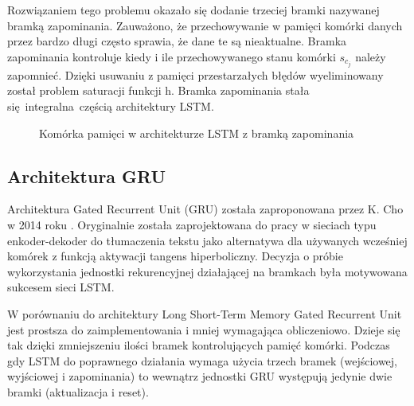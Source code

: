 \documentclass[10pt,a4paper]{article}
\begin{document}
Rozwiązaniem tego problemu okazało się dodanie trzeciej bramki nazywanej bramką zapominania. Zauważono, że przechowywanie w pamięci komórki danych przez bardzo długi często sprawia, że dane te są nieaktualne. Bramka zapominania kontroluje kiedy i ile przechowywanego stanu komórki $s_{c_j}$ należy zapomnieć. Dzięki usuwaniu z pamięci przestarzałych błędów wyeliminowany został problem saturacji funkcji h. Bramka zapominania stała się integralna częścią architektury LSTM. 

\begin{figure}[!ht]
	\centering
	\caption{Komórka pamięci w architekturze LSTM z bramką zapominania}
\end{figure}
\FloatBarrier
\newpage
\subsection{Architektura GRU}

Architektura Gated Recurrent Unit (GRU) została zaproponowana przez K. Cho w 2014 roku \cite{https://doi.org/10.48550/arxiv.1406.1078}. Oryginalnie została zaprojektowana do pracy w sieciach typu enkoder-dekoder do tłumaczenia tekstu jako alternatywa dla używanych wcześniej komórek z funkcją aktywacji tangens hiperboliczny. Decyzja o próbie wykorzystania jednostki rekurencyjnej działającej na bramkach była motywowana sukcesem sieci LSTM.

W porównaniu do architektury Long Short-Term Memory Gated Recurrent Unit jest prostsza do zaimplementowania i mniej wymagająca obliczeniowo. Dzieje się tak dzięki zmniejszeniu ilości bramek kontrolujących pamięć komórki. Podczas gdy LSTM do poprawnego działania wymaga użycia trzech bramek (wejściowej, wyjściowej i zapominania) to wewnątrz jednostki GRU występują jedynie dwie bramki (aktualizacja i reset). 
\end{document}
